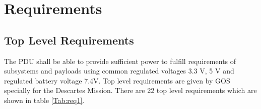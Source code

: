 \chapter{Requirements\label{cha:chapter3}}

\section{Top Level Requirements}
The PDU shall be able to provide sufficient power to fulfill requirements of subsystems and payloads using common regulated voltages 3.3 V, 5 V and regulated battery voltage 7.4V. Top level requirements are given by GOS specially for the Descartes Mission. There are 22 top level requirements which are shown in table \ref{Tab:req1}.  \\ \\

